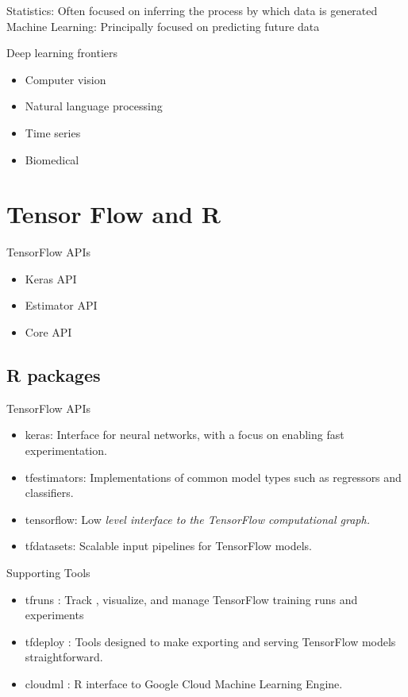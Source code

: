 \documentclass[
]{book}
\providecommand{\tightlist}{%
  \setlength{\itemsep}{0pt}\setlength{\parskip}{0pt}}
\begin{document}
Statistics: Often focused on inferring the process by which data is generated Machine Learning: Principally focused on predicting future data

Deep learning frontiers

\begin{itemize}
\tightlist
\item
  Computer vision
\item
  Natural language processing
\item
  Time series
\item
  Biomedical
\end{itemize}

\pagebreak

\hypertarget{tensor-flow-and-r}{%
\chapter{Tensor Flow and R}\label{tensor-flow-and-r}}

TensorFlow APIs

\begin{itemize}
\tightlist
\item
  Keras API
\item
  Estimator API
\item
  Core API
\end{itemize}

\hypertarget{r-packages}{%
\section{R packages}\label{r-packages}}

TensorFlow APIs

\begin{itemize}
\item
  keras: Interface for neural networks, with a focus on enabling fast experimentation.
\item
  tfestimators: Implementations of common model types such as regressors and classifiers.
\item
  tensorflow: Low \emph{level interface to the TensorFlow computational graph.}
\item
  tfdatasets: Scalable input pipelines for TensorFlow models.
\end{itemize}

Supporting Tools

\begin{itemize}
\item
  tfruns : Track , visualize, and manage TensorFlow training runs and experiments
\item
  tfdeploy : Tools designed to make exporting and serving TensorFlow models straightforward.
\item
  cloudml : R interface to Google Cloud Machine Learning Engine.
\end{itemize}
\end{document}
